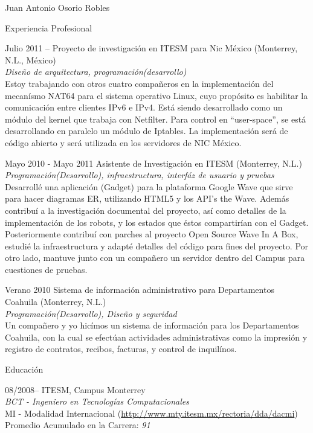 \documentclass[spanish,10pt,letterpaper]{article}
\begin{document}
\begin{cv}{Juan Antonio Osorio Robles}
	\begin{cvlist}{Experiencia Profesional}
		\item [Julio 2011 --]
			Proyecto de investigación en ITESM para Nic México (Monterrey, N.L., México)
			\\ \emph{Diseño de arquitectura, programación(desarrollo)}
			\\ Estoy trabajando con otros cuatro compañeros en la implementación del mecanísmo NAT64 para el sistema operativo Linux, cuyo propósito es habilitar la comunicación entre clientes IPv6 e IPv4. Está siendo desarrollado como un módulo del kernel que trabaja con Netfilter. Para control en ``user-space'', se está desarrollando en paralelo un módulo de Iptables. La implementación será de código abierto y será utilizada en los servidores de NIC México.
		\item [Mayo 2010 - Mayo 2011]
			Asistente de Investigación en ITESM (Monterrey, N.L.)
			\\ \emph{Programación(Desarrollo), infraestructura, interfáz de usuario y pruebas}
			\\ Desarrollé una aplicación (Gadget) para la plataforma Google Wave que sirve para hacer diagramas ER, utilizando HTML5 y los API's the Wave. Además contribuí a la investigación documental del proyecto, así como detalles de la implementación de los robots, y los estados que éstos compartirían con el Gadget. Posteriormente contribuí con parches al proyecto Open Source Wave In A Box, estudié la infraestructura y adapté detalles del código para fines del proyecto. Por otro lado, mantuve junto con un compañero un servidor dentro del Campus para cuestiones de pruebas.
		\item [Verano 2010]
			Sistema de información administrativo para Departamentos Coahuila (Monterrey, N.L.)
			\\ \emph{Programación(Desarrollo), Diseño y seguridad}
			\\ Un compañero y yo hicímos un sistema de información para los Departamentos Coahuila, con la cual se efectúan actividades administrativas como la impresión y registro de contratos, recibos, facturas, y control de inquilínos.
			
	\end{cvlist}

	\begin{cvlist}{Educación}
		\item	[08/2008--]
				ITESM, Campus Monterrey
				\\
				\emph{BCT - Ingeniero en Tecnologías Computacionales}
				\\
				MI - Modalidad Internacional (\href{http://www.mty.itesm.mx/rectoria/dda/dacmi}{http://www.mty.itesm.mx/rectoria/dda/dacmi})
				\\
				Promedio Acumulado en la Carrera: \emph{91}
	\end{cvlist}


\end{cv}
\end{document}
